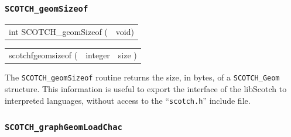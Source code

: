 \subsubsection{{\tt SCOTCH\_geomSizeof}}

\begin{itemize}
\progsyn

{\tt\begin{tabular}{l@{}l}
int SCOTCH\_geomSizeof ( & void)
\end{tabular}}

{\tt\begin{tabular}{l@{}ll}
scotchfgeomsizeof ( & integer & size )
\end{tabular}}

\progdes

The {\tt SCOTCH\_geomSizeof} routine returns the size, in bytes, of a
{\tt SCOTCH\_\lbt Geom} structure. This information is useful to
export the interface of the {\sc libScotch} to interpreted languages,
without access to the ``{\tt scotch.h}'' include file.
\end{itemize}

\subsubsection{{\tt SCOTCH\_graphGeomLoadChac}}

